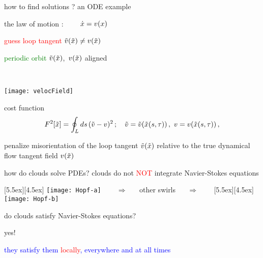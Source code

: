\begin{frame}{how to find solutions ? an ODE example}
\begin{center}
the law of motion : $\qquad \dot{x} = v(x)$
\begin{minipage}[c]{0.55\textwidth}
\textcolor{red}{guess loop tangent}
$\tilde{v}(\tilde{x})
	\neq
v(\tilde{x})$

	\vskip 0.5cm

\textcolor{green}{periodic orbit}
$\tilde{v}(\tilde{x})$,~$v(\tilde{x})$
aligned
\end{minipage}%
~~~~~~~\begin{minipage}[c]{0.40\textwidth}
	\begin{center}
	\texttt{[image: velocField]}
	\end{center}
\end{minipage}
\end{center}
\begin{block}{cost function}%
\[
F^2[\tilde{x}] =
            \oint_L ds\,(\tilde{v}-v)^2
    \,;\quad
    \tilde{v} = \tilde{v}(\tilde{x}(s,\tau))\,,\,\,
    v = v(\tilde{x}(s,\tau))
\,,
\]
\end{block}
\bigskip

penalize %
 misorientation of the loop tangent
$\tilde{v}(\tilde{x})$
relative to the true dynamical flow tangent field $v(\tilde{x})$
\end{frame}

\begin{frame}{how do clouds solve PDEs?}
clouds do not \textcolor{red}{\Huge NOT} {integrate} Navier-Stokes equations

\bigskip\bigskip

\begin{center}
\begin{minipage}[t]{\textwidth}
	\begin{center}
\centerline{
\raisebox{-4.0ex}[5.5ex][4.5ex]
		 {\texttt{[image: Hopf-a]}}
~~~ $\Longrightarrow$ ~~ {other swirls} ~~ $\Longrightarrow$ ~~~
	\raisebox{-4.0ex}[5.5ex][4.5ex]
		 {\texttt{[image: Hopf-b]}}
          }
	\end{center}
\end{minipage}
\end{center}

do clouds satisfy Navier-Stokes equations?

\bigskip

{\Large yes!}

\centerline{
\textcolor{blue}{they satisfy them \textcolor{red}{\large locally}, everywhere and at all times}
}
\end{frame}

